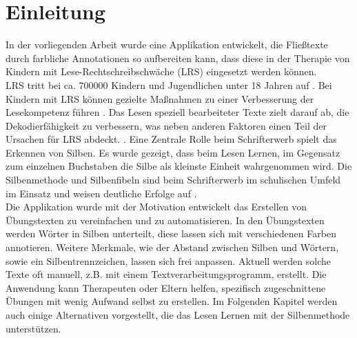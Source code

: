 
\chapter{Einleitung}

In der vorliegenden Arbeit wurde eine Applikation entwickelt, die Fließtexte durch farbliche Annotationen so aufbereiten kann, dass diese in der Therapie von Kindern mit Lese-Rechtschreibschwäche (LRS) eingesetzt werden können.\\

LRS tritt bei ca. 700000 Kindern und Jugendlichen unter 18 Jahren auf \cite{Schulte-Koerne2014} . Bei Kindern mit LRS können gezielte Maßnahmen zu einer Verbesserung der Lesekompetenz führen . Das Lesen speziell bearbeiteter Texte zielt darauf ab, die Dekodierfähigkeit zu verbessern, was neben anderen Faktoren einen Teil der Ursachen für LRS abdeckt. . Eine Zentrale Rolle beim Schrifterwerb spielt das Erkennen von Silben. Es wurde gezeigt, dass beim Lesen Lernen, im Gegensatz zum einzelnen Buchstaben die Silbe als kleinste Einheit wahrgenommen wird.  Die Silbenmethode und Silbenfibeln sind beim Schrifterwerb im schulischen Umfeld im Einsatz  und weisen deutliche Erfolge auf .\\

Die Applikation wurde mit der Motivation entwickelt das Erstellen von Übungstexten zu vereinfachen und zu automatisieren. In den Übungstexten werden Wörter in Silben unterteilt, diese lassen sich mit verschiedenen Farben annotieren. Weitere Merkmale, wie der Abstand zwischen Silben und Wörtern, sowie ein Silbentrennzeichen, lassen sich frei anpassen. Aktuell werden solche Texte oft manuell, z.B. mit einem Textverarbeitungsprogramm, erstellt. Die Anwendung kann Therapeuten oder Eltern helfen, spezifisch zugeschnittene Übungen mit wenig Aufwand selbst zu erstellen. Im Folgenden Kapitel werden auch einige Alternativen vorgestellt, die das Lesen Lernen mit der Silbenmethode unterstützen.\\







